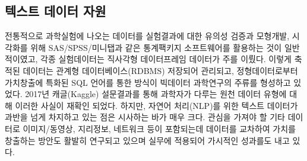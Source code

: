 \documentclass[smallextended]{svjour3}       %
\begin{document}
\hypertarget{uxd14duxc2a4uxd2b8-uxb370uxc774uxd130-uxc790uxc6d0}{%
\subsection{텍스트 데이터
자원}\label{uxd14duxc2a4uxd2b8-uxb370uxc774uxd130-uxc790uxc6d0}}

전통적으로 과학실험에 나오는 데이터를 실험결과에 대한 유의성 검증과
모형개발, 시각화를 위해 SAS/SPSS/미니탭과 같은 통계팩키지 소프트웨어를
활용하는 것이 일반적이였고, 각종 실험데이터는 직사각형 데이터프레임
데이터가 주를 이뤘다. 이렇게 축적된 데이터는 관계형 데이터베이스(RDBMS)
저장되어 관리되고, 정형데이터로부터 가치창출에 특화된 SQL 언어를 통한
방식이 빅데이터 과학연구의 주류를 형성하고 있었다. 2017년 캐글(Kaggle)
설문결과를 통해 과학자가 다루는 원천 데이터 유형에 대해 이러한 사실이
재확인 되었다. 하지만, 자연어 처리(NLP)를 위한 텍스트 데이터가 과반을
넘게 차지하고 있는 점은 시사하는 바가 매우 크다. 관심을 가져야 할 기타
데이터로 이미지/동영상, 지리정보, 네트워크 등이 포함되는데 데이터를
교차하여 가치를 창출하는 방안도 활발히 연구되고 있으며 실무에 적용되어
가시적인 성과를도 내고 있다.
\end{document}
